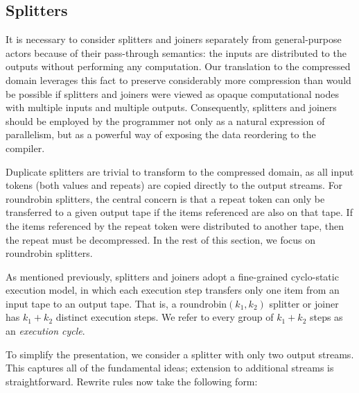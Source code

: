 

\subsection{Splitters}

It is necessary to consider splitters and joiners separately from
general-purpose actors because of their pass-through semantics: the
inputs are distributed to the outputs without performing any
computation.  Our translation to the compressed domain leverages this
fact to preserve considerably more compression than would be possible
if splitters and joiners were viewed as opaque computational nodes
with multiple inputs and multiple outputs.  Consequently, splitters
and joiners should be employed by the programmer not only as a natural
expression of parallelism, but as a powerful way of exposing the data
reordering to the compiler.

Duplicate splitters are trivial to transform to the compressed domain,
as all input tokens (both values and repeats) are copied directly to
the output streams.  For roundrobin splitters, the central concern is
that a repeat token can only be transferred to a given output tape if
the items referenced are also on that tape.  If the items referenced
by the repeat token were distributed to another tape, then the repeat
must be decompressed.  In the rest of this section, we focus on
roundrobin splitters.

As mentioned previously, splitters and joiners adopt a fine-grained
cyclo-static execution model, in which each execution step transfers
only one item from an input tape to an output tape.  That is, a
roundrobin$(k_1, k_2)$ splitter or joiner has $k_1 + k_2$ distinct
execution steps.  We refer to every group of $k_1 + k_2$ steps as an
{\it execution cycle}.

To simplify the presentation, we consider a splitter with only two
output streams.  This captures all of the fundamental ideas; extension
to additional streams is straightforward.  Rewrite rules now take the
following form:

